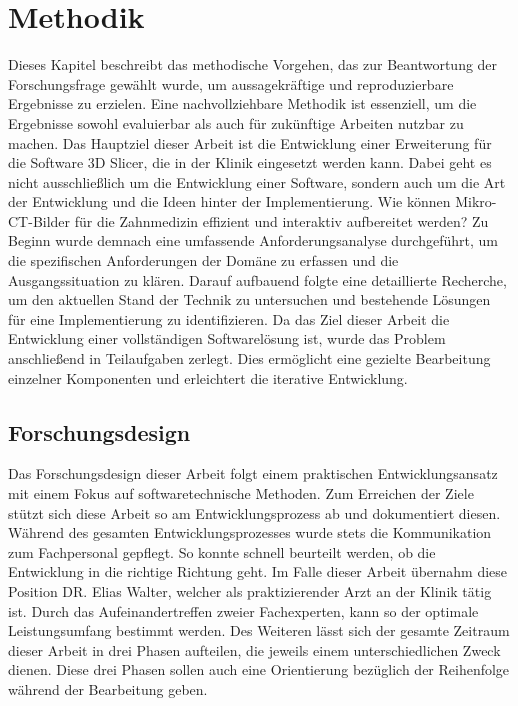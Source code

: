\chapter{Methodik}
\label{chap:methodik} Dieses Kapitel beschreibt das methodische Vorgehen, das
zur Beantwortung der Forschungsfrage gewählt wurde, um aussagekräftige und reproduzierbare
Ergebnisse zu erzielen. Eine nachvollziehbare Methodik ist essenziell, um die Ergebnisse
sowohl evaluierbar als auch für zukünftige Arbeiten nutzbar zu machen. Das
Hauptziel dieser Arbeit ist die Entwicklung einer Erweiterung für die Software
3D Slicer, die in der Klinik eingesetzt werden kann. Dabei geht es nicht
ausschließlich um die Entwicklung einer Software, sondern auch um die Art der Entwicklung
und die Ideen hinter der Implementierung. Wie können Mikro-\ac{CT}-Bilder für die
Zahnmedizin effizient und interaktiv aufbereitet werden? Zu Beginn wurde demnach
eine umfassende Anforderungsanalyse durchgeführt, um die spezifischen Anforderungen
der Domäne zu erfassen und die Ausgangssituation zu klären. Darauf aufbauend
folgte eine detaillierte Recherche, um den aktuellen Stand der Technik zu untersuchen
und bestehende Lösungen für eine Implementierung zu identifizieren. Da das Ziel
dieser Arbeit die Entwicklung einer vollständigen Softwarelösung ist, wurde das Problem
anschließend in Teilaufgaben zerlegt. Dies ermöglicht eine gezielte Bearbeitung
einzelner Komponenten und erleichtert die iterative Entwicklung.

\section{Forschungsdesign}
Das Forschungsdesign dieser Arbeit folgt einem praktischen Entwicklungsansatz
mit einem Fokus auf softwaretechnische Methoden. Zum Erreichen der Ziele stützt sich
diese Arbeit so am Entwicklungsprozess ab und dokumentiert diesen. Während des
gesamten Entwicklungsprozesses wurde stets die Kommunikation zum Fachpersonal
gepflegt. So konnte schnell beurteilt werden, ob die Entwicklung in die richtige
Richtung geht. Im Falle dieser Arbeit übernahm diese Position DR. Elias Walter, welcher
als praktizierender Arzt an der Klinik tätig ist. Durch das Aufeinandertreffen
zweier Fachexperten, kann so der optimale Leistungsumfang bestimmt werden. Des
Weiteren lässt sich der gesamte Zeitraum dieser Arbeit in drei Phasen aufteilen,
die jeweils einem unterschiedlichen Zweck dienen. Diese drei Phasen sollen auch
eine Orientierung bezüglich der Reihenfolge während der Bearbeitung geben.
\pagebreak

